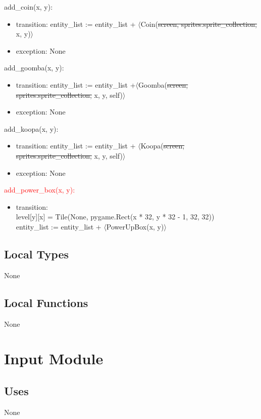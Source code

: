 \documentclass[12pt]{article}
\begin{document}
add\_coin(x, y):
\begin{itemize}
    \item transition: entity\_list := entity\_list + $\langle$Coin(\st{screen, sprites.sprite\_collection,} x, y)$\rangle$
    \item exception: None
\end{itemize}

add\_goomba(x, y):
\begin{itemize}
    \item transition: entity\_list := entity\_list +$\langle$Goomba(\st{screen, sprites.sprite\_collection, }x, y, self)$\rangle$
    \item exception: None
\end{itemize}

add\_koopa(x, y):
\begin{itemize}
    \item transition: entity\_list := entity\_list + $\langle$Koopa(\st{screen, sprites.sprite\_collection, }x, y, self)$\rangle$
    \item exception: None
\end{itemize}

\textcolor{red}{add\_power\_box(x, y):}
\begin{itemize}
    \item \color{red}transition:\\ level[y][x] = Tile(None, pygame.Rect(x * 32, y * 32 - 1, 32, 32))\\
    entity\_list := entity\_list + $\langle$PowerUpBox(x, y)$\rangle$
\end{itemize}

\subsection* {Local Types}

None

\subsection* {Local Functions}

None

\newpage

\section*{Input Module}
\subsection*{Uses}
None
\end{document}

